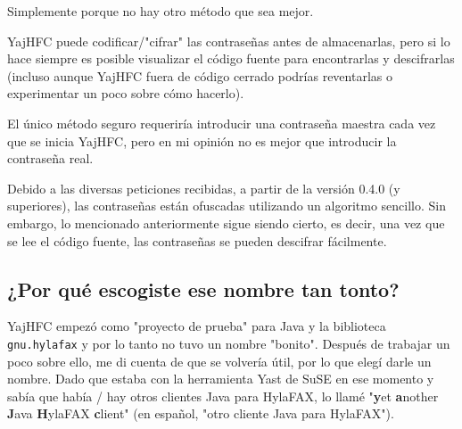 \documentclass[a4paper,10pt]{scrartcl}
\begin{document}
Simplemente porque no hay otro método que sea mejor.


YajHFC puede codificar/"cifrar" las contraseñas antes de almacenarlas, 
pero si lo hace siempre es posible visualizar el código fuente para encontrarlas 
y descifrarlas (incluso aunque YajHFC fuera de código cerrado podrías reventarlas o experimentar un poco sobre cómo hacerlo).


El único método seguro requeriría introducir una contraseña maestra cada vez que se inicia YajHFC, pero en mi opinión no es mejor que introducir la contraseña real.

Debido a las diversas peticiones recibidas, a partir de la versión 0.4.0 (y superiores), las contraseñas están ofuscadas utilizando un algoritmo sencillo.
Sin embargo, lo mencionado anteriormente sigue siendo cierto, es decir, una vez que se lee el código fuente, las contraseñas se pueden descifrar fácilmente.

\subsection{¿Por qué escogiste ese nombre tan tonto?}

YajHFC empezó como "proyecto de prueba" para Java y la biblioteca \texttt{gnu.hylafax}
y por lo tanto no tuvo un nombre "bonito". Después de trabajar un poco sobre ello, me di cuenta de que se volvería útil, por lo que elegí darle un nombre.
Dado que estaba con la herramienta Yast de SuSE en ese momento y sabía 
que había / hay otros clientes Java para HylaFAX, lo llamé "\textbf{y}et \textbf{a}nother \textbf{J}ava \textbf{H}ylaFAX \textbf{c}lient" (en español, "otro cliente Java para HylaFAX").
 
\end{document}
